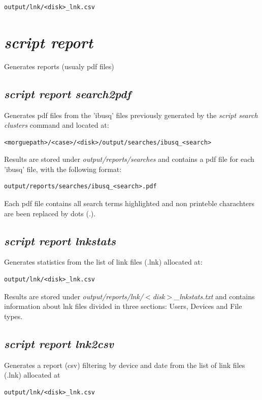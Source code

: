 \documentclass[a4paper,11pt,oneside]{report}
\begin{document}
\begin{verbatim}
output/lnk/<disk>_lnk.csv
\end{verbatim}


\section{\emph{script report}}

Generates reports (usualy pdf files)

\subsection{\emph{script report search2pdf}} 

Generates pdf files from the 'ibusq' files previously generated by the  \emph{script search clusters} command and located at:

\begin{verbatim}
<morguepath>/<case>/<disk>/output/searches/ibusq_<search>
\end{verbatim}

Results are stored under \emph{output/reports/searches} and contains a pdf file for each 'ibusq' file, with the following format:

\begin{verbatim}
output/reports/searches/ibusq_<search>.pdf
\end{verbatim}

Each pdf file contains all search terms highlighted and non printeble charachters are been replaced by dots (.).

\subsection{\emph{script report lnkstats}}

Generates statistics from the list of link files (.lnk) allocated at:
\begin{verbatim}
output/lnk/<disk>_lnk.csv
\end{verbatim}

Results are stored under \emph{output/reports/lnk/$<$disk$>$\_lnkstats.txt} and contains information about lnk files divided in three sections: Users, Devices and File types.

\subsection{\emph{script report lnk2csv}}

Generates a report (csv) filtering by device and date from the list of link files (.lnk) allocated at
\begin{verbatim}
output/lnk/<disk>_lnk.csv
\end{verbatim}
\end{document}
